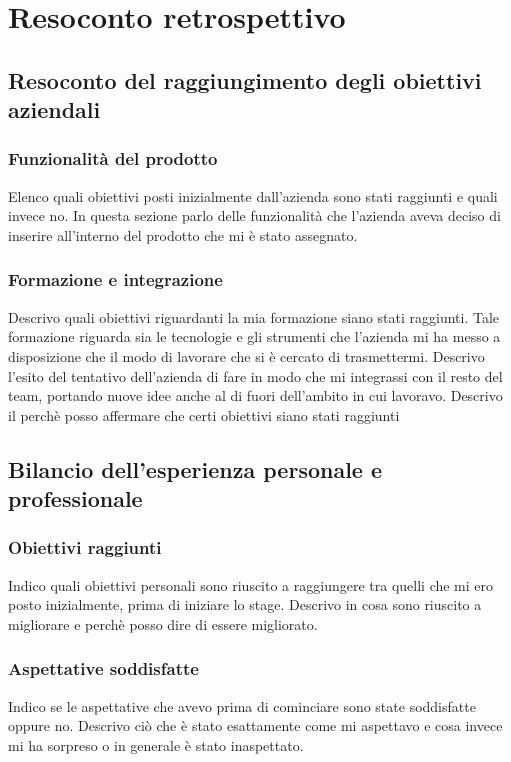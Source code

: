 \chapter{Resoconto retrospettivo}
	\section{Resoconto del raggiungimento degli obiettivi aziendali}
		\subsection{Funzionalità del prodotto}
			Elenco quali obiettivi posti inizialmente dall'azienda sono stati raggiunti e quali invece no. In questa sezione parlo delle
			funzionalità che l'azienda aveva deciso di inserire all'interno del prodotto che mi è stato assegnato.
		\subsection{Formazione e integrazione}
			Descrivo quali obiettivi riguardanti la mia formazione siano stati raggiunti. Tale formazione riguarda sia le tecnologie e
			gli strumenti che l'azienda mi ha messo a disposizione che il modo di lavorare che si è cercato di trasmettermi. Descrivo
			l'esito del tentativo dell'azienda di fare in modo che mi integrassi con il resto del team, portando nuove idee anche al di
			fuori dell'ambito in cui lavoravo. Descrivo il perchè posso affermare che certi obiettivi siano stati raggiunti
	\section{Bilancio dell'esperienza personale e professionale}
		\subsection{Obiettivi raggiunti}
			Indico quali obiettivi personali sono riuscito a raggiungere tra quelli che mi ero posto inizialmente, prima di iniziare
			lo stage. Descrivo in cosa sono riuscito a migliorare e perchè posso dire di essere migliorato.
		\subsection{Aspettative soddisfatte}
			Indico se le aspettative che avevo prima di cominciare sono state soddisfatte oppure no. Descrivo ciò che è stato esattamente
			come mi aspettavo e cosa invece mi ha sorpreso o in generale è stato inaspettato.
